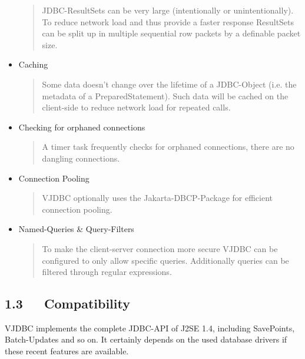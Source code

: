 \documentclass[10pt,a4paper,english]{article}
\begin{document}
\begin{itemize}
\begin{quote}
JDBC-ResultSets can be very large (intentionally or unintentionally). To reduce 
network load and thus provide a faster response ResultSets can be split up 
in multiple sequential row packets by a definable packet size.
\end{quote}

\item {} 
Caching
\begin{quote}

Some data doesn't change over the lifetime of a JDBC-Object (i.e. the metadata 
of a PreparedStatement). Such data will be cached on the client-side to reduce 
network load for repeated calls.
\end{quote}

\item {} 
Checking for orphaned connections
\begin{quote}

A timer task frequently checks for orphaned connections, there are no dangling 
connections.
\end{quote}

\item {} 
Connection Pooling
\begin{quote}

VJDBC optionally uses the Jakarta-DBCP-Package for efficient connection pooling.
\end{quote}

\item {} 
Named-Queries {\&} Query-Filters
\begin{quote}

To make the client-server connection more secure VJDBC can be configured to only
allow specific queries. Additionally queries can be filtered through regular
expressions.
\end{quote}

\end{itemize}



\hypertarget{compatibility}{}
\subsection*{1.3~~~Compatibility}

VJDBC implements the complete JDBC-API of J2SE 1.4, including SavePoints, Batch-Updates and so on. It certainly depends on the used database drivers if these recent features are available.
\end{document}
